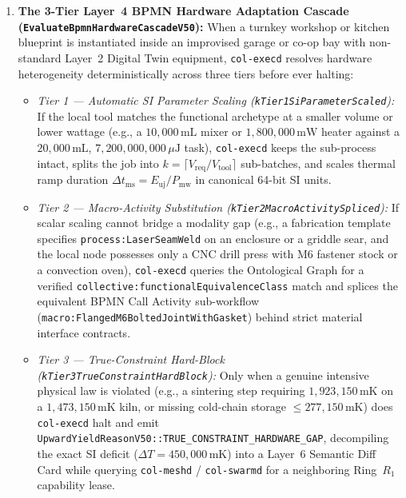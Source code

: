 \begin{enumerate}
    \item \textbf{The 3-Tier Layer~4 BPMN Hardware Adaptation Cascade (\texttt{EvaluateBpmnHardwareCascadeV50}):}
    When a turnkey workshop or kitchen blueprint is instantiated inside an improvised garage or co-op
    bay with non-standard Layer~2 Digital Twin equipment, \texttt{col-execd} resolves hardware
    heterogeneity deterministically across three tiers before ever halting:
    \begin{itemize}
        \item \emph{Tier 1 --- Automatic SI Parameter Scaling (\texttt{kTier1SiParameterScaled}):} If
        the local tool matches the functional archetype at a smaller volume or lower wattage (e.g., a
        $10{,}000\,\mathrm{mL}$ mixer or $1{,}800{,}000\,\mathrm{mW}$ heater against a
        $20{,}000\,\mathrm{mL}$, $7{,}200{,}000{,}000\,\mu\mathrm{J}$ task), \texttt{col-execd} keeps
        the sub-process intact, splits the job into $k = \lceil V_{\mathrm{req}} / V_{\mathrm{tool}} \rceil$
        sub-batches, and scales thermal ramp duration $\Delta t_{\mathrm{ms}} = E_{\mathrm{uj}} / P_{\mathrm{mw}}$
        in canonical 64-bit SI units.
        \item \emph{Tier 2 --- Macro-Activity Substitution (\texttt{kTier2MacroActivitySpliced}):} If
        scalar scaling cannot bridge a modality gap (e.g., a fabrication template specifies
        \texttt{process:LaserSeamWeld} on an enclosure or a griddle sear, and the local node possesses
        only a CNC drill press with M6 fastener stock or a convection oven), \texttt{col-execd} queries
        the Ontological Graph for a verified \texttt{collective:functionalEquivalenceClass} match and
        splices the equivalent BPMN Call Activity sub-workflow (\texttt{macro:FlangedM6BoltedJointWithGasket})
        behind strict material interface contracts.
        \item \emph{Tier 3 --- True-Constraint Hard-Block (\texttt{kTier3TrueConstraintHardBlock}):}
        Only when a genuine intensive physical law is violated (e.g., a sintering step requiring
        $1{,}923{,}150\,\mathrm{mK}$ on a $1{,}473{,}150\,\mathrm{mK}$ kiln, or missing cold-chain
        storage $\le 277{,}150\,\mathrm{mK}$) does \texttt{col-execd} halt and emit
        \texttt{UpwardYieldReasonV50::TRUE\_CONSTRAINT\_HARDWARE\_GAP}, decompiling the exact SI
        deficit ($\Delta T = 450{,}000\,\mathrm{mK}$) into a Layer~6 Semantic Diff Card while querying
        \texttt{col-meshd} / \texttt{col-swarmd} for a neighboring Ring~$R_1$ capability lease.
    \end{itemize}


\end{enumerate}
